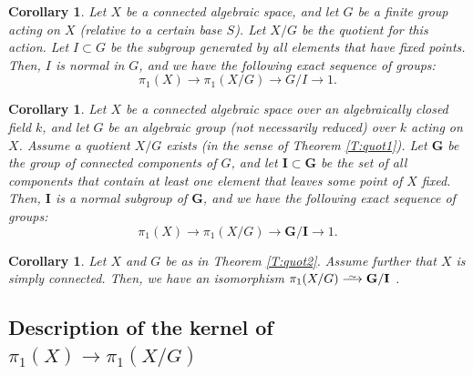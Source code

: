 \documentclass{amsart}
\newtheorem{cor}[thm]{Corollary}
\theoremstyle{definition}
\theoremstyle{remark}
\theoremstyle{remark}
\def\smashedlongrightarrow{\setbox0=\hbox{$\longrightarrow$}\ht0=1pt\box0}
\def\risom{\buildrel\sim\over{\smashedlongrightarrow}}
\begin{document}
\begin{cor}{\label{C:quot3}}
Let $X$ be a connected algebraic space, and let $G$ be a finite
group acting on $X$ (relative to a certain base $S$). Let $X/G$ be
the quotient for this action. Let $I \subset G$ be the subgroup
generated by all elements that have fixed points. Then, $I$ is
normal in $G$, and we have the following exact sequence of groups:
$$ \pi_1(X) \to \pi_1(X/G) \to G/I \to 1.$$
\end{cor}

\begin{cor}{\label{C:quot4}}
Let $X$ be a connected algebraic space over an algebraically
closed field $k$, and let $G$ be an algebraic group (not
necessarily reduced) over $k$ acting on $X$. Assume a quotient
$X/G$ exists (in the sense of Theorem \ref{T:quot1}). Let
$\mathbf{G}$ be the group of connected components of $G$, and let
$\mathbf{I} \subset \mathbf{G}$ be the set of all components that
contain at least one element that leaves some point of $X$ fixed.
Then, $\mathbf{I}$ is a normal subgroup of $\mathbf{G}$, and we
have the following exact sequence of groups: $$ \pi_1(X) \to
\pi_1(X/G) \to \mathbf{G/I} \to 1.$$
\end{cor}

\begin{cor}{\label{C:quot5}}
Let $X$ and $G$ be as in Theorem \ref{T:quot2}. Assume further
that $X$ is simply connected. Then, we have an isomorphism $
\pi_1(X/G) \risom \mathbf{G/I}$ .
\end{cor}

\subsection{Description of the kernel of $\pi_1(X) \to \pi_1(X/G)$}
\end{document}
